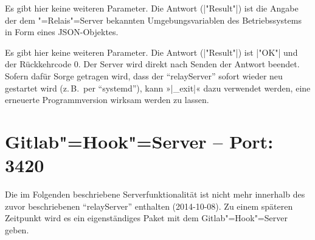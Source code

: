 \documentclass[titlepage=false,toc=nobibliography]{vl-report}
\newcommand*\theServer{relayServer}
\newcommand*\action[1]{\fbox{\nolinkurl{#1}}\medskip\par}
\begin{document}
\begin{description}
\begin{description}
      \noindent Es gibt hier keine weiteren Parameter. Die Antwort
      (|"Result"|) ist die Angabe der dem "=Relais"=Server
      bekannten Umgebungsvariablen des Betriebssystems in Form eines
      JSON-Objektes.

    \item \action{_exit}

      \noindent Es gibt hier keine weiteren Parameter. Die Antwort (|"Result"|)
      ist |"OK"| und der Rückkehrcode 0. Der Server wird direkt nach Senden der
      Antwort beendet. Sofern dafür Sorge getragen wird, dass der
      "`\theServer"' sofort wieder neu gestartet wird (z.\,B.\ per
      "`systemd"'), kann »|_exit|« dazu verwendet werden, eine erneuerte
      Programmversion wirksam werden zu lassen.

  \end{description}

\end{description}

\section{Gitlab"=Hook"=Server -- Port: 3420}

 Die im Folgenden beschriebene Serverfunktionalität ist
nicht mehr innerhalb des zuvor beschriebenen  "`\theServer"' enthalten
(2014-10-08). Zu einem späteren Zeitpunkt wird es ein eigenständiges Paket mit
dem Gitlab"=Hook"=Server geben.

\bigskip
\end{document}
